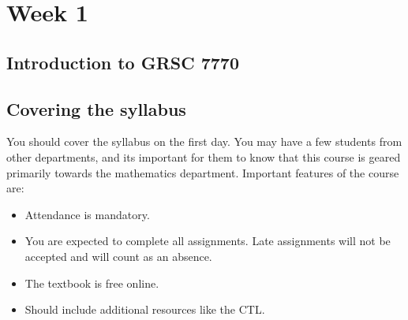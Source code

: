 \section{Week 1}
\label{sec:week-1}

\subsection{Introduction to GRSC 7770}
\label{sec:intr-grsc-7770}

\subsection{Covering the syllabus}
\label{sec:covering-syllabus}

You should cover the syllabus on the first day.  You may have a few students from other departments, and its important for them to know that this course is geared primarily towards the mathematics department.  Important features of the course are:

\begin{itemize}
\item Attendance is mandatory.
\item You are expected to complete all assignments.  Late assignments will not be accepted and will count as an absence.
\item The textbook is free online.
\item Should include additional resources like the CTL.
\end{itemize}




